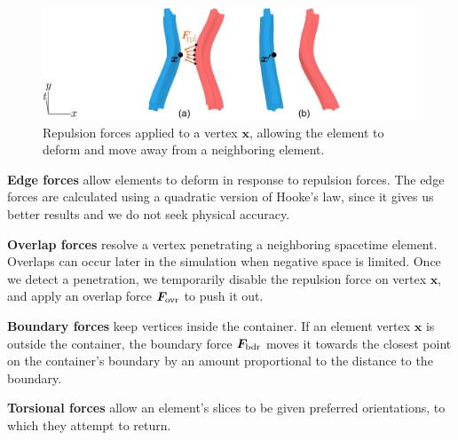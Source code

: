\begin{figure} 
\centering
\includegraphics[width=1.0\textwidth]{figures/animationpak/repulsion_force.pdf} 
\caption[An illustration of the repulsion forces]
{\label{fig_animationpak_repulsion_force} 
Repulsion forces applied to a vertex $\bm{x}$, 
allowing the element to deform and move away from a neighboring element.}
\end{figure}



\newtext
{
\textbf{Edge forces}
allow elements to deform in response to repulsion forces.
}
\nnewtext
{The edge forces are calculated using a quadratic version of Hooke's law, 
since it gives us better results and we do not seek physical accuracy.}

\newtext
{
\textbf{Overlap forces} resolve a vertex penetrating a
neighboring spacetime element.
Overlaps can occur later in the simulation when negative space is 
limited.  Once we detect a penetration,  
we temporarily disable the repulsion force on vertex $\bm{x}$, and apply
an overlap force $\bm{F}_\mathrm{ovr}$ to push it out.
}

\newtext
{
\textbf{Boundary forces} keep vertices inside the container.
If an element vertex $\bm{x}$
is outside the container, the boundary force $\bm{F}_\mathrm{bdr}$ moves
it towards the closest point
on the container's boundary by an amount proportional to the distance to
the boundary.
}

\newtext
{
\textbf{Torsional forces} allow an element's slices to be given
preferred orientations, to which they attempt to return.
}

